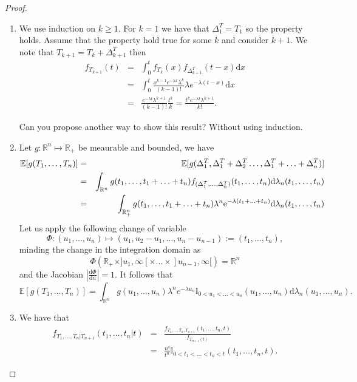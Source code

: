 \begin{proof}
\begin{enumerate}
\item We use induction on $k\geq1$. For $k=1$ we have that $\Delta^T_1= T_1$ so the property holds. Assume that the property hold true for some $k$ and consider $k+1$. We note that $T_{k+1}=T_k+\Delta^T_{k+1}$ then
\begin{eqnarray*}
f_{T_{k+1}}(t)&=&\int_{0}^{t}f_{T_k}(x)f_{\Delta^T_{k+1}}(t-x)\text{d}x\\
&=&\int_{0}^{t}\frac{x^{k-1}e^{-\lambda x}\lambda^k}{(k-1)!}\lambda e^{-\lambda(t-x)}\text{d}x\\
&=&\frac{e^{-\lambda t}\lambda^{k+1}}{(k-1)!}\frac{t^k}{k}=\frac{t^k e^{-\lambda t}\lambda^{k+1}}{k!}.
\end{eqnarray*}
\begin{exercise}
Can you propose another way to show this result? Without using induction.
\end{exercise}
\item Let $g:\mathbb{R}^n\mapsto \mathbb{R}_+$ be meaurable and bounded, we have
\begin{eqnarray*}
\mathbb{E}[g(T_{1},\ldots,T_n)]&=& \mathbb{E}[g(\Delta^T_{1},\Delta^T_1+\Delta^T_2\ldots,\Delta^T_1+\ldots+ \Delta^T_n)]\\
&=&\int_{\mathbb{R}^n}g(t_{1},\ldots,t_1+\ldots+ t_n)f_{(\Delta^T_{1},\ldots,\Delta^T_n)}(t_1,\ldots,t_n)\text{d}\lambda_n(t_{1},\ldots,t_n)\\
&=&\int_{\mathbb{R}_+^n}g(t_{1},\ldots,t_1+\ldots+ t_n)\lambda^n\mathrm{e}^{-\lambda(t_1+\ldots+t_n)}\text{d}\lambda_n(t_{1},\ldots,t_n)\\
\end{eqnarray*}
Let us apply the following change of variable 
$$
\Phi:(u_{1},\ldots,u_n)\mapsto(u_1, u_{2}-u_1,\ldots,u_n-u_{n-1}):=(t_1,\ldots, t_n),$$
minding the change in the integration domain as 
$$
\Phi(\mathbb{R}_+\times ]u_1,\infty[\times \ldots\times ]u_{n-1},\infty[) = \mathbb{R}^n 
$$
and the Jacobian $\left|\frac{\text{d}\Phi}{\text{d}u}\right|=1$. It follows that
$$
\mathbb{E}[g(T_{1},\ldots,T_n)]=\int_{\mathbb{R}^n} g(u_1,\ldots, u_n)\lambda^{n}e^{-\lambda u_n}\mathbb{I}_{0<u_1<\ldots<u_n}(u_1,\ldots, u_n)\text{d}\lambda_{n}(u_1,\ldots, u_n).
$$
\item We have that 
\begin{eqnarray*}
f_{T_1,\ldots, T_n|T_{n+1}}(t_1,\ldots,t_n|t)
&=&\frac{f_{T_1,\ldots, T_n,T_{n+1}}(t_1,\ldots,t_n,t)}{f_{T_{n+1}(t)}}\\
&=&\frac{n!}{t^n}\mathbb{I}_{0<t_1<\ldots< t_n<t}(t_1,\ldots, t_n, t).
\end{eqnarray*}
\end{enumerate}
\end{proof}
